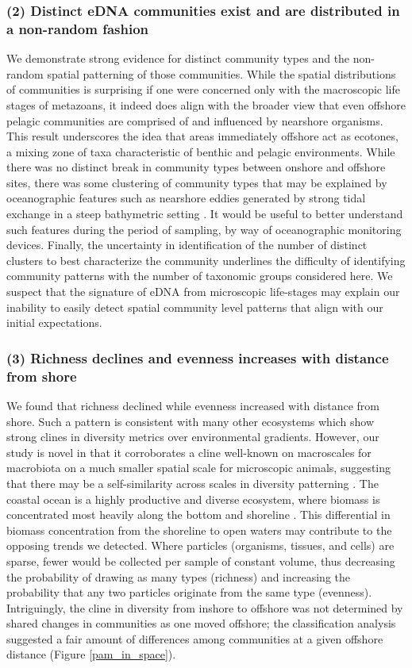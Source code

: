 \documentclass[11pt,letterpaper]{article} %
\begin{document}
\subsubsection*{(2) Distinct eDNA communities exist and are distributed in a non-random fashion}
 We demonstrate strong evidence for distinct community types and the non-random spatial patterning of those communities. While the spatial distributions of communities is surprising if one were concerned only with the macroscopic life stages of metazoans, it indeed does align with the broader view that even offshore pelagic communities are comprised of and influenced by nearshore organisms. This result underscores the idea that areas immediately offshore act as ecotones, a mixing zone of taxa characteristic of benthic and pelagic environments. While there was no distinct break in community types between onshore and offshore sites, there was some clustering of community types that may be explained by oceanographic features such as nearshore eddies generated by strong tidal exchange in a steep bathymetric setting \citep{Yang2010}. It would be useful to better understand such features during the period of sampling, by way of oceanographic monitoring devices.
Finally, the uncertainty in identification of the number of distinct clusters to best characterize the community underlines the difficulty of identifying community patterns with the number of taxonomic groups considered here. We suspect that the signature of eDNA from microscopic life-stages may explain our inability to easily detect spatial community level patterns that align with our initial expectations.

 \subsubsection*{(3) Richness declines and evenness increases with distance from shore}
We found that richness declined while evenness increased with distance from shore.
Such a pattern is consistent with many other ecosystems which show strong clines in diversity metrics over environmental gradients.
However, our study is novel in that it corroborates a cline well-known on macroscales for macrobiota on a much smaller spatial scale for microscopic animals, suggesting that there may be a self-similarity across scales in diversity patterning \citep{Levin1992}.
The coastal ocean is a highly productive and diverse ecosystem, where biomass is concentrated most heavily along the bottom and shoreline \citep{Ray1988}.
This differential in biomass concentration from the shoreline to open waters may contribute to the opposing trends we detected.
Where particles (organisms, tissues, and cells) are sparse, fewer would be collected per sample of constant volume, thus decreasing the probability of drawing as many types (richness) and increasing the probability that any two particles originate from the same type (evenness).
Intriguingly, the cline in diversity from inshore to offshore was not determined by shared changes in communities as one moved offshore; the classification analysis suggested a fair amount of differences among communities at a given offshore distance (Figure \ref{pam_in_space}).
\end{document}
